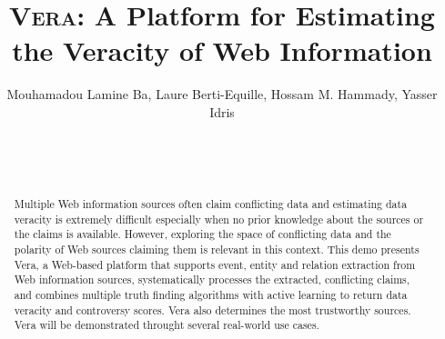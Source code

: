 \documentclass{sig-alternate}
\begin{document}
\conferenceinfo{}{}

\title{{\scshape Vera}: A Platform for Estimating the Veracity of Web Information}

\author{
\alignauthor
Mouhamadou Lamine Ba, Laure Berti-Equille, Hossam M. Hammady, Yasser Idris\\
       \\
       \\
       \\
}


\maketitle

\begin{abstract}
Multiple Web information sources often claim conflicting data and estimating data veracity is extremely difficult especially when no prior knowledge about the sources or the claims is available. However, exploring the space of conflicting data and the polarity of Web sources claiming them is relevant in this context.
This demo presents Vera, a Web-based platform that supports event, entity and relation
extraction from Web information sources, systematically processes the extracted, conflicting claims, and
combines multiple truth finding algorithms with active learning to return data veracity and controversy scores. Vera also determines the most trustworthy sources. Vera will be demonstrated throught several real-world use cases.
\end{abstract}

\end{document}
